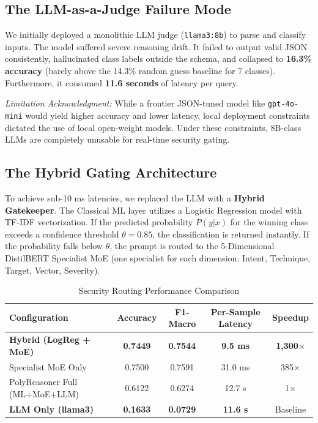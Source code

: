 \documentclass[11pt,a4paper]{article}
\begin{document}
\subsection{The LLM-as-a-Judge Failure Mode}

We initially deployed a monolithic LLM judge (\texttt{llama3:8b}) to parse and classify inputs. The model suffered severe reasoning drift. It failed to output valid JSON consistently, hallucinated class labels outside the schema, and collapsed to \textbf{16.3\% accuracy} (barely above the 14.3\% random guess baseline for 7 classes). Furthermore, it consumed \textbf{11.6 seconds} of latency per query.

\textit{Limitation Acknowledgment:} While a frontier JSON-tuned model like \texttt{gpt-4o-mini} would yield higher accuracy and lower latency, local deployment constraints dictated the use of local open-weight models. Under these constraints, 8B-class LLMs are completely unusable for real-time security gating.

\subsection{The Hybrid Gating Architecture}

To achieve sub-10 ms latencies, we replaced the LLM with a \textbf{Hybrid Gatekeeper}. The Classical ML layer utilizes a Logistic Regression model with TF-IDF vectorization. If the predicted probability $P(y|x)$ for the winning class exceeds a confidence threshold $\theta = 0.85$, the classification is returned instantly. If the probability falls below $\theta$, the prompt is routed to the 5-Dimensional DistilBERT Specialist MoE (one specialist for each dimension: Intent, Technique, Target, Vector, Severity).

\begin{table}[ht]
\centering
\footnotesize
\setlength{\tabcolsep}{3pt}
\caption{Security Routing Performance Comparison}
\label{tab:security_routing}
\begin{tabular}{>{\raggedright\arraybackslash}p{4.0cm}cccc}
\toprule
\textbf{Configuration} & \textbf{Accuracy} & \textbf{F1-Macro} & \textbf{Per-Sample Latency} & \textbf{Speedup} \\
\midrule
\textbf{Hybrid (LogReg + MoE)} & \textbf{0.7449} & \textbf{0.7544} & \textbf{9.5 ms} & \textbf{1,300$\times$} \\
Specialist MoE Only & 0.7500 & 0.7591 & 31.0 ms & 385$\times$ \\
PolyReasoner Full (ML+MoE+LLM) & 0.6122 & 0.6274 & 12.7 s & 1$\times$ \\
\textbf{LLM Only (llama3)} & \textbf{0.1633} & \textbf{0.0729} & \textbf{11.6 s} & Baseline \\
\bottomrule
\end{tabular}
\end{table}
\end{document}
